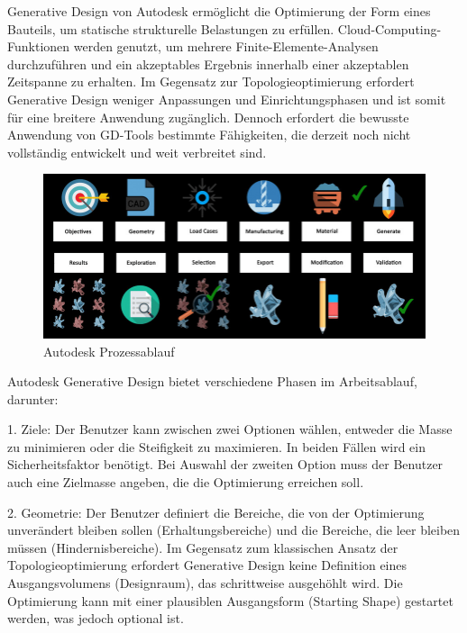 Generative Design von Autodesk ermöglicht die Optimierung der Form eines Bauteils, um statische strukturelle Belastungen zu erfüllen. Cloud-Computing-Funktionen werden genutzt, um mehrere Finite-Elemente-Analysen durchzuführen und ein akzeptables Ergebnis innerhalb einer akzeptablen Zeitspanne zu erhalten. Im Gegensatz zur Topologieoptimierung erfordert Generative Design weniger Anpassungen und Einrichtungsphasen und ist somit für eine breitere Anwendung zugänglich. Dennoch erfordert die bewusste Anwendung von GD-Tools bestimmte Fähigkeiten, die derzeit noch nicht vollständig entwickelt und weit verbreitet sind. 



\begin{figure}[h]
    \begin{minipage}{0.5\textwidth}
      \centering
      \includegraphics[width=\textwidth]{./images/Autodesk-Generative-Design-Framework.jpeg}
    \end{minipage}
    \caption{Autodesk Prozessablauf}
    \label{fig:meinbild}
  \end{figure}
  

Autodesk Generative Design bietet verschiedene Phasen im Arbeitsablauf, darunter:

1. Ziele: Der Benutzer kann zwischen zwei Optionen wählen, entweder die Masse zu minimieren oder die Steifigkeit zu maximieren. In beiden Fällen wird ein Sicherheitsfaktor benötigt. Bei Auswahl der zweiten Option muss der Benutzer auch eine Zielmasse angeben, die die Optimierung erreichen soll.

2. Geometrie: Der Benutzer definiert die Bereiche, die von der Optimierung unverändert bleiben sollen (Erhaltungsbereiche) und die Bereiche, die leer bleiben müssen (Hindernisbereiche). Im Gegensatz zum klassischen Ansatz der Topologieoptimierung erfordert Generative Design keine Definition eines Ausgangsvolumens (Designraum), das schrittweise ausgehöhlt wird. Die Optimierung kann mit einer plausiblen Ausgangsform (Starting Shape) gestartet werden, was jedoch optional ist.

